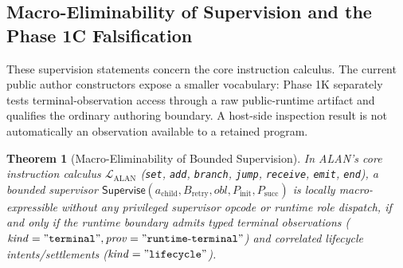 \documentclass[11pt,a4paper]{article}
\newtheorem{theorem}{Theorem}[section]
\theoremstyle{definition}
\theoremstyle{remark}
\begin{document}
\subsection{Macro-Eliminability of Supervision and the Phase 1C Falsification}

These supervision statements concern the core instruction calculus. The current public author constructors expose a smaller vocabulary: Phase 1K separately tests terminal-observation access through a raw public-runtime artifact and qualifies the ordinary authoring boundary. A host-side inspection result is not automatically an observation available to a retained program.

\begin{theorem}[Macro-Eliminability of Bounded Supervision]
\label{thm:supervise}
In ALAN's core instruction calculus $\mathcal{L}_{\text{ALAN}}$ (\texttt{set}, \texttt{add}, \texttt{branch}, \texttt{jump}, \texttt{receive}, \texttt{emit}, \texttt{end}), a bounded supervisor $\mathsf{Supervise}(a_{\text{child}}, B_{\text{retry}}, \mathit{obl}, P_{\text{init}}, P_{\text{succ}})$ is locally macro-expressible without any privileged supervisor opcode or runtime role dispatch, \emph{if and only if} the runtime boundary admits typed terminal observations ($\mathit{kind}=\mathtt{"terminal"}, \mathit{prov}=\mathtt{"runtime\text{-}terminal"}$) and correlated lifecycle intents/settlements ($\mathit{kind}=\mathtt{"lifecycle"}$).
\end{theorem}
\end{document}
